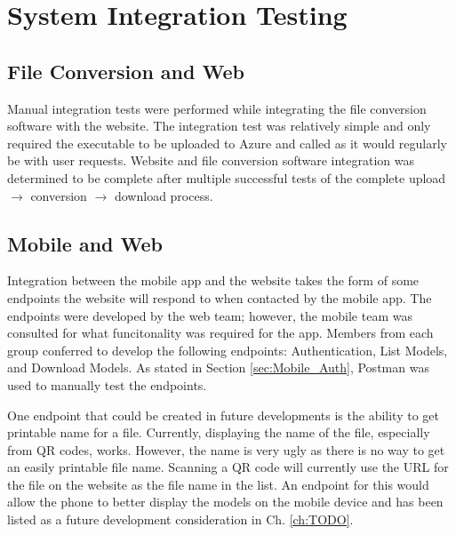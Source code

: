 
\section{System Integration Testing}

	\subsection{File Conversion and Web}
		
		Manual integration tests were performed while integrating the file conversion software with the website. The integration test was relatively simple and only required the executable to be uploaded to Azure and called as it would regularly be with user requests. Website and file conversion software integration was determined to be complete after multiple successful tests of the complete upload $\rightarrow$ conversion $\rightarrow$ download process.

	\subsection{Mobile and Web}

		Integration between the mobile app and the website takes the form of some endpoints the website will respond to when contacted by the mobile app. The endpoints were developed by the web team; however, the mobile team was consulted for what funcitonality was required for the app. Members from each group conferred to develop the following endpoints: Authentication, List Models, and Download Models.  As stated in Section \ref{sec:Mobile_Auth}, Postman was used to manually test the endpoints.

		One endpoint that could be created in future developments is the ability to get printable name for a file.  Currently, displaying the name of the file, especially from QR codes, works.  However, the name is very ugly as there is no way to get an easily printable file name.  Scanning a QR code will currently use the URL for the file on the website as the file name in the list. An endpoint for this would allow the phone to better display the models on the mobile device and has been listed as a future development consideration in Ch. \ref{ch:TODO}. 